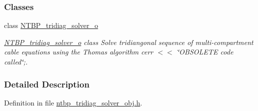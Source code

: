 \subsubsection*{Classes}
\begin{DoxyCompactItemize}
\item 
class \hyperlink{class_n_t_b_p__tridiag__solver__o}{NTBP\_\-tridiag\_\-solver\_\-o}
\begin{DoxyCompactList}\small\item\em \hyperlink{class_n_t_b_p__tridiag__solver__o}{NTBP\_\-tridiag\_\-solver\_\-o} class Solve tridiangonal sequence of multi-\/compartment cable equations using the Thomas algorithm cerr $<$$<$ \char`\"{}OBSOLETE code called\char`\"{};. \item\end{DoxyCompactList}\end{DoxyCompactItemize}


\subsubsection{Detailed Description}


Definition in file \hyperlink{ntbp__tridiag__solver__obj_8h_source}{ntbp\_\-tridiag\_\-solver\_\-obj.h}.

